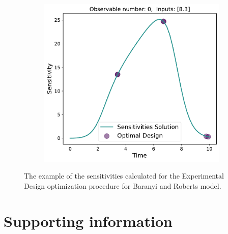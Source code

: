 \documentclass[10pt,A4paper]{article}
\begin{document}
\begin{figure}[H]
    \begin{subfigure}{.48\textwidth}
        \centering
        \includegraphics[scale=0.38]{Figures/Sensitivities_Results_baranyi_roberts_ode_fisher_determinant_rel_sensit_cont_6times_1temps_v20_000_x_00_p_01.pdf}
    \end{subfigure}
    \caption{{\footnotesize The example of the sensitivities calculated for the Experimental Design optimization procedure for Baranyi and Roberts model.}} 
    \label{fig:baranyi_roberts_sensitivities}
    \end{figure}

%
%
%
\section*{Supporting information}
%
%
%
\nolinenumbers

\end{document}
